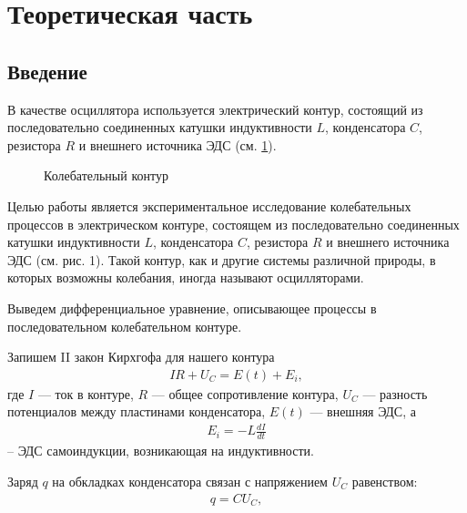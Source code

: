 \section{Теоретическая часть}

\subsection{Введение}

В качестве осциллятора используется электрический контур, состоящий из последовательно соединенных катушки индуктивности \(L\), конденсатора \(C\), резистора \(R\) и внешнего источника ЭДС (см. \cref{fig:th:1}). 
\begin{figure}[H]
	\centering
	\caption{Колебательный контур}
	\label{fig:th:1}
\end{figure}

Целью работы является экспериментальное исследование колебательных процессов в электрическом контуре, состоящем из последовательно соединенных катушки индуктивности \( L \), конденсатора \( C \), резистора \( R \) и внешнего источника ЭДС (см. рис. 1). Такой контур, как и другие системы различной природы, в которых возможны колебания, иногда называют осцилляторами.

Выведем дифференциальное уравнение, описывающее процессы в последовательном колебательном контуре.

Запишем II закон Кирхгофа для нашего контура  
\begin{align} \label{eq:th:1}
	IR + U_C = E(t) + E_i,
\end{align}
где \( I \) — ток в контуре, \( R \) — общее сопротивление контура, \( U_C \) — разность потенциалов между пластинами конденсатора, \( E(t) \) — внешняя ЭДС, а  
\begin{align} \label{eq:th:2}
	E_i = -L \frac{dI}{dt}
\end{align}
-- ЭДС самоиндукции, возникающая на индуктивности.

Заряд \( q \) на обкладках конденсатора связан с напряжением \( U_C \) равенством:  
\begin{align} \label{eq:th:3}
	q = CU_C,
\end{align}

